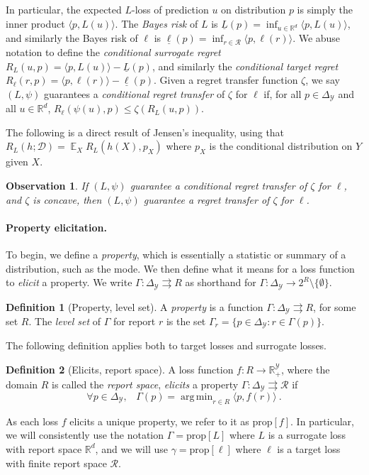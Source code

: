 \documentclass{article}
\newtheorem{observation}{Observation}
\theoremstyle{definition}\newtheorem{definition}{Definition}
\theoremstyle{definition}\newtheorem{assumption}{Assumption}
\DeclareMathOperator*{\argmin}{arg\,min}
\newcommand{\reals}{\mathbb{R}}
\newcommand{\prop}[1]{\mathrm{prop}[#1]}
\newcommand{\simplex}{\Delta_\Y}
\newcommand{\D}{\mathcal{D}}
\DeclareMathOperator{\E}{\mathbb{E}}  %
\newcommand{\R}{\mathcal{R}}
\newcommand{\Y}{\mathcal{Y}}
\newcommand{\risk}[1]{\underline{#1}}
\newcommand{\inprod}[2]{\langle #1, #2 \rangle}%
\newcommand{\toto}{\rightrightarrows}
\begin{document}
In particular, the expected $L$-loss of prediction $u$ on distribution $p$ is simply the inner product $\inprod{p}{L(u)}$.
The \emph{Bayes risk} of $L$ is $\risk{L}(p) = \inf_{u \in \reals^d} \inprod{p}{L(u)}$, and similarly the Bayes risk of $\ell$ is $\risk{\ell}(p) = \inf_{r \in \R} \inprod{p}{\ell(r)}$.
We abuse notation to define the \emph{conditional surrogate regret} $R_L(u,p) = \inprod{p}{L(u)} - \risk{L}(p)$, and similarly the \emph{conditional target regret} $R_{\ell}(r,p) = \inprod{p}{\ell(r)} - \risk{\ell}(p)$.
Given a regret transfer function $\zeta$, we say $(L,\psi)$ guarantees a \emph{conditional regret transfer} of $\zeta$ for $\ell$ if, for all $p \in \simplex$ and all $u \in \reals^d$, $R_{\ell}(\psi(u),p) \leq \zeta(R_L(u,p))$.

The following is a direct result of Jensen's inequality, using that $R_L(h;\D) = \E_X R_L(h(X),p_X)$ where $p_X$ is the conditional distribution on $Y$ given $X$.
\begin{observation} \label{obs:transfer}
  If $(L,\psi)$ guarantee a conditional regret transfer of $\zeta$ for $\ell$, and $\zeta$ is concave, then $(L,\psi)$ guarantee a regret transfer of $\zeta$ for $\ell$.
\end{observation}
 
\paragraph{Property elicitation.}
To begin, we define a \emph{property}, which is essentially a statistic or summary of a distribution, such as the mode.
We then define what it means for a loss function to \emph{elicit} a property.
We write $\Gamma: \simplex \toto R$ as shorthand for $\Gamma: \simplex \to 2^{R} \setminus \{\emptyset\}$.

\begin{definition}[Property, level set]\label{def:property}
  A \emph{property} is a function $\Gamma:\simplex\toto R$, for some set $R$.
  The \emph{level set} of $\Gamma$ for report $r$ is the set $\Gamma_r = \{p \in \simplex : r \in \Gamma(p)\}$.
\end{definition}
The following definition applies both to target losses and surrogate losses.
\begin{definition}[Elicits, report space]
  \label{def:elicits}
  A loss function $f:R\to\reals^\Y_+$, where the domain $R$ is called the \emph{report space}, \emph{elicits} a property $\Gamma:\simplex \toto \R$ if
  \begin{equation}
    \forall p\in\simplex,\;\;\;\Gamma(p) = \argmin_{r \in R} \inprod{p}{f(r)}~.
  \end{equation}
\end{definition}
As each loss $f$ elicits a unique property, we refer to it as $\prop{f}$.
In particular, we will consistently use the notation $\Gamma = \prop{L}$ where $L$ is a surrogate loss with report space $\reals^d$, and we will use $\gamma = \prop{\ell}$ where $\ell$ is a target loss with finite report space $\R$.
\end{document}
